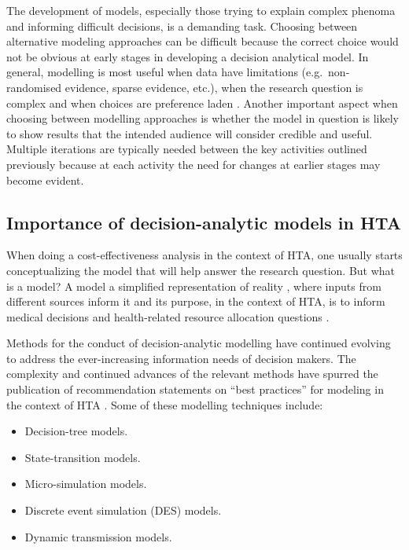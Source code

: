 \documentclass[
]{book}
\providecommand{\tightlist}{%
  \setlength{\itemsep}{0pt}\setlength{\parskip}{0pt}}
\begin{document}
The development of models, especially those trying to explain complex phenoma and informing difficult decisions, is a demanding task. Choosing between alternative modeling approaches can be difficult because the correct choice would not be obvious at early stages in developing a decision analytical model. In general, modelling is most useful when data have limitations (e.g.~non-randomised evidence, sparse evidence, etc.), when the research question is complex and when choices are preference laden \citep{dahabreh2016guidance}. Another important aspect when choosing between modelling approaches is whether the model in question is likely to show results that the intended audience will consider credible and useful. Multiple iterations are typically needed between the key activities outlined previously because at each activity the need for changes at earlier stages may become evident.

\hypertarget{importance-of-decision-analytic-models-in-hta}{%
\subsection{Importance of decision-analytic models in HTA}\label{importance-of-decision-analytic-models-in-hta}}

When doing a cost-effectiveness analysis in the context of HTA, one usually starts conceptualizing the model that will help answer the research question. But what is a model? A model a simplified representation of reality \citep{roberts2012conceptualizing}, where inputs from different sources inform it and its purpose, in the context of HTA, is to inform medical decisions and health-related resource allocation questions \citep{roberts2012conceptualizing}.

Methods for the conduct of decision-analytic modelling have continued evolving to address the ever-increasing information needs of decision makers. The complexity and continued advances of the relevant methods have spurred the publication of recommendation statements on ``best practices'' for modeling in the context of HTA \citep{roberts2012conceptualizing, briggs2012model}. Some of these modelling techniques \citep{caro2012modeling} include:

\begin{itemize}
\tightlist
\item
  Decision-tree models.
\item
  State-transition models.
\item
  Micro-simulation models.
\item
  Discrete event simulation (DES) models.
\item
  Dynamic transmission models.
\end{itemize}
\end{document}
